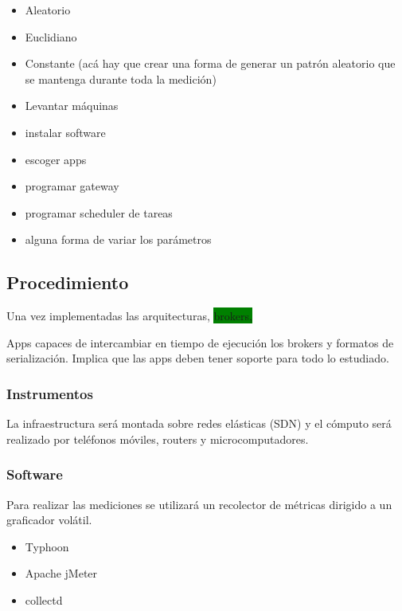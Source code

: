 \begin{itemize}
  \item Aleatorio
  \item Euclidiano
  \item Constante (acá hay que crear una forma de generar un patrón aleatorio que se mantenga durante toda la medición)
\end{itemize}

\begin{itemize}
  \item Levantar máquinas
  \item instalar software
  \item escoger apps
  \item programar gateway
  \item programar scheduler de tareas
  \item alguna forma de variar los parámetros
\end{itemize}

\subsection{Procedimiento}
Una vez implementadas las arquitecturas, \colorbox{green}{brokers, }

Apps capaces de intercambiar en tiempo de ejecución los brokers y formatos de serialización.
Implica que las apps deben tener soporte para todo lo estudiado.


\subsubsection{Instrumentos}
La infraestructura será montada sobre redes elásticas (SDN) y el cómputo será realizado por teléfonos móviles, routers y microcomputadores.

\subsubsection{Software}

Para realizar las mediciones se utilizará un recolector de métricas dirigido a un graficador volátil.

\begin{itemize}
  \item Typhoon
  \item Apache jMeter
  \item collectd
\end{itemize}

